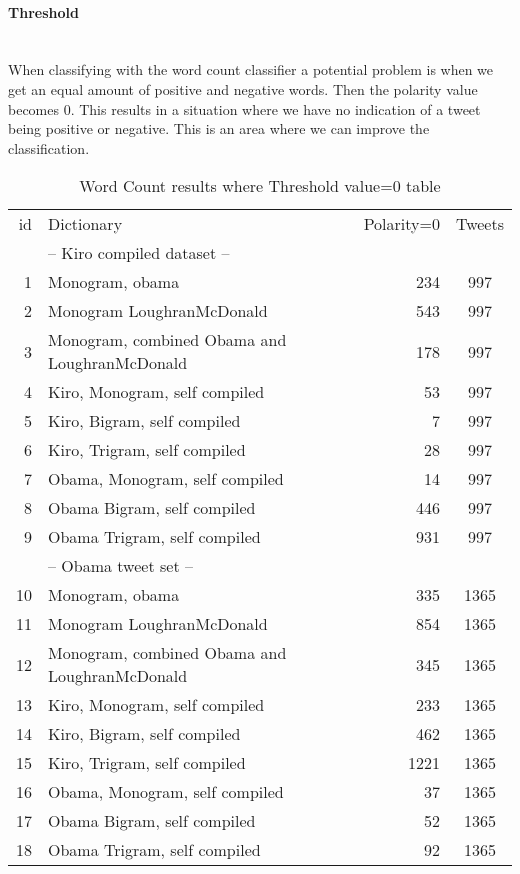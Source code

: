 \paragraph{Threshold}
\hspace{0pt}\\
When classifying with the word count classifier a potential problem is when we
get an equal amount of positive and negative words. Then the polarity value
becomes 0. This results in a situation where we have no indication of a tweet
being positive or negative. This is an area where we can improve the
classification. 

\begin{table}
\centering
\label{tbl:word_counting_polarity_null}
\caption{Word Count results where Threshold value=0 table}
\begin{tabular}{ r p{6cm} r c }
id & Dictionary & Polarity=0 & Tweets \\
& -- Kiro compiled dataset -- & & \\
\hline
1 & Monogram, obama & 234 & 997 \\ 
2 & Monogram LoughranMcDonald & 543 & 997 \\ 
3 & Monogram, combined Obama and LoughranMcDonald & 178 & 997 \\
4 & Kiro, Monogram, self compiled & 53 & 997 \\
5 & Kiro, Bigram, self compiled & 7 & 997 \\
6 & Kiro, Trigram, self compiled & 28 & 997 \\
7 & Obama, Monogram, self compiled & 14 & 997 \\
8 & Obama Bigram, self compiled & 446 & 997 \\
9 & Obama Trigram, self compiled & 931 & 997 \\

& -- Obama tweet set -- & & \\
\hline
10 & Monogram, obama & 335 & 1365 \\ 
11 & Monogram LoughranMcDonald & 854 & 1365 \\
12 & Monogram, combined Obama and LoughranMcDonald & 345 & 1365 \\
13 & Kiro, Monogram, self compiled & 233 & 1365 \\
14 & Kiro, Bigram, self compiled & 462 & 1365 \\
15 & Kiro, Trigram, self compiled & 1221 & 1365 \\
16 & Obama, Monogram, self compiled & 37 & 1365 \\
17 & Obama Bigram, self compiled & 52 & 1365 \\
18 & Obama Trigram, self compiled & 92 & 1365 \\
\end{tabular}
\end{table}

